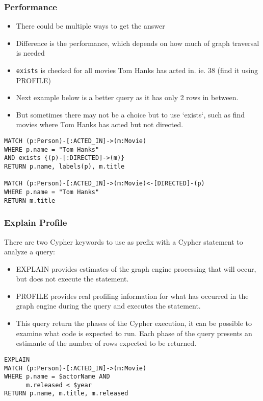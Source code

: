 \begin{frame}[fragile]\frametitle{Performance}

\begin{itemize}
\item There could be multiple ways to get the answer
\item Difference is the performance, which depends on how much of graph traversal is needed
\item \lstinline|exists| is checked for all movies Tom Hanks has acted in. ie. 38 (find it using PROFILE)
\item Next example below is a better query as it has only 2 rows in between.
\item But sometimes there may not be a choice but to use `exists`, such as find movies where Tom Hanks has acted but not directed.
\end{itemize}

\begin{lstlisting}
MATCH (p:Person)-[:ACTED_IN]->(m:Movie)
WHERE p.name = "Tom Hanks"
AND exists {(p)-[:DIRECTED]->(m)}
RETURN p.name, labels(p), m.title

MATCH (p:Person)-[:ACTED_IN]->(m:Movie)<-[DIRECTED]-(p)
WHERE p.name = "Tom Hanks"
RETURN m.title
\end{lstlisting}

\end{frame}


\begin{frame}[fragile]\frametitle{Explain Profile}

There are two Cypher keywords to use as prefix with a Cypher statement to analyze a query:
\begin{itemize}
\item EXPLAIN provides estimates of the graph engine processing that will occur, but does not execute the statement.
\item PROFILE provides real profiling information for what has occurred in the graph engine during the query and executes the statement.
\item This query return the phases of the Cypher execution, it can be possible to examine what code is expected to run. Each phase of the query presents an estimante of the number of rows expected to be returned.
\end{itemize}

\begin{lstlisting}
EXPLAIN
MATCH (p:Person)-[:ACTED_IN]->(m:Movie)
WHERE p.name = $actorName AND
      m.released < $year
RETURN p.name, m.title, m.released

\end{lstlisting}

\end{frame}


